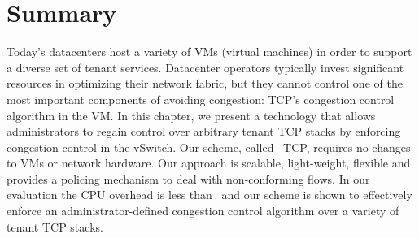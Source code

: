 \section{Summary}
Today's datacenters host a variety of VMs (virtual machines) in order to
support a diverse set of tenant services. Datacenter operators
typically invest significant resources in optimizing their network fabric,
but they cannot control one of the most important components of 
avoiding congestion: TCP's congestion control algorithm in the VM. In this chapter,
we present a technology that allows administrators to regain control over arbitrary tenant TCP stacks by enforcing congestion
control in the vSwitch. Our scheme, called~\acdc{} TCP, requires no 
changes to VMs or network hardware. Our approach is scalable, light-weight,
flexible and provides a policing mechanism to deal with non-conforming flows.
In our evaluation the CPU overhead is less than~ and our scheme 
is shown to effectively enforce an administrator-defined congestion control
algorithm over a variety of tenant TCP stacks.

